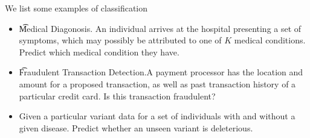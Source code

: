 
We list some examples of classification

  \begin{itemize}
\item \t{Medical Diagonosis}. An individual arrives at the hospital presenting a set of symptoms, which may possibly be attributed to one of $K$ medical conditions. Predict which medical condition they have.
\item \t{Fraudulent Transaction Detection}.A payment processor has the location and amount for a proposed transaction, as well as past transaction history of a particular credit card. Is this transaction fraudulent?
\item Given a particular variant data for a set of individuals with and without a given disease. Predict whether an unseen variant is deleterious.
  \end{itemize}
\blankpage

